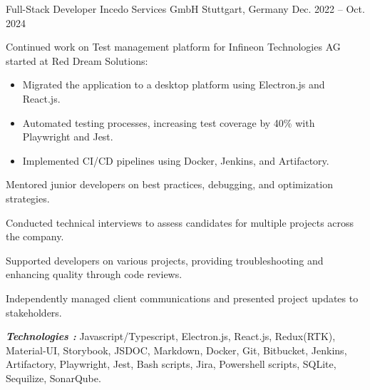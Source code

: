 

\begin{cventries}

  \cventry
    {Full-Stack Developer} %
    {Incedo Services GmbH} %
    {Stuttgart, Germany} %
    {Dec. 2022 – Oct. 2024} %
    {
      \begin{cvitems} %
        \item {Continued work on Test management platform for Infineon Technologies AG started at Red Dream Solutions:
        \begin{itemize}
          \item{Migrated the application to a desktop platform using Electron.js and React.js.}
          \item{Automated testing processes, increasing test coverage by 40\% with Playwright and Jest.}
          \item{Implemented CI/CD pipelines using Docker, Jenkins, and Artifactory.}
        \end{itemize}
        }
        \item {Mentored junior developers on best practices, debugging, and optimization strategies.}
        \item {Conducted technical interviews to assess candidates for multiple projects across the company.}
        \item {Supported developers on various projects, providing troubleshooting and enhancing quality through code reviews.}
        \item {Independently managed client communications and presented project updates to stakeholders.}
       \end{cvitems}
       \vspace{5mm}
      \textbf{\textit{Technologies :}} Javascript/Typescript, Electron.js, React.js, Redux(RTK), Material‐UI,
       Storybook, JSDOC, Markdown, Docker, Git, Bitbucket, Jenkins, Artifactory,
        Playwright, Jest, Bash scripts, Jira, Powershell scripts, SQLite, Sequilize, SonarQube.
      \vspace{5mm}
    }


\end{cventries}
